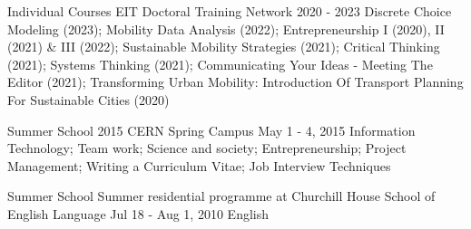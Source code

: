 

\begin{cventries}
  \cventryshort
    {Individual Courses} %
    {EIT Doctoral Training Network} %
    {2020 - 2023} %
    {} %
    {
    Discrete Choice Modeling (2023);
    Mobility Data Analysis (2022);
    Entrepreneurship I (2020), II (2021) \& III (2022);
    Sustainable Mobility Strategies (2021);
    Critical Thinking (2021); 
    Systems Thinking (2021); 
    Communicating Your Ideas - Meeting The Editor (2021);
    Transforming Urban Mobility: Introduction Of Transport Planning For Sustainable Cities (2020) 
    }
    
  \cventryshort
    {Summer School} %
    {2015 CERN Spring Campus} %
    {May 1 - 4, 2015} %
    {} %
    {
    Information Technology; 
    Team work;
    Science and society;
    Entrepreneurship;
    Project Management;
    Writing a Curriculum Vitae;
    Job Interview Techniques
    }

  \cventryshort
    {Summer School} %
    {Summer residential programme at Churchill House School of English Language} %
    {Jul 18 - Aug 1, 2010} %
    {} %
    {
    English
    }

\end{cventries}
